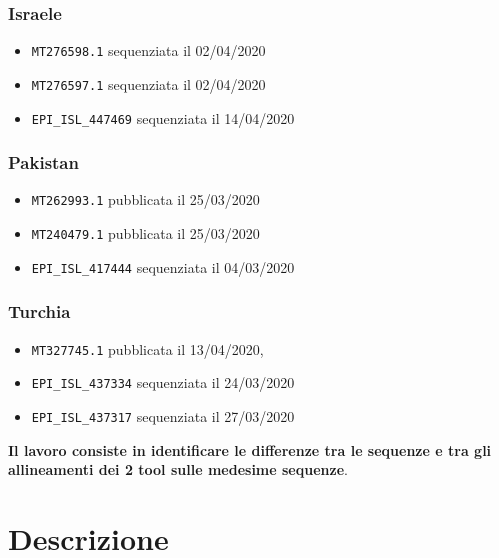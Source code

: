 \documentclass[11pt,italian]{article}
\begin{document}
\subsubsection*{Israele}
\begin{itemize}
	\item \lstinline{MT276598.1} sequenziata il 02/04/2020
	\item \lstinline{MT276597.1} sequenziata il 02/04/2020
	\item \lstinline{EPI_ISL_447469} sequenziata il 14/04/2020
\end{itemize}

\subsubsection*{Pakistan}
\begin{itemize}
	\item \lstinline{MT262993.1} pubblicata il 25/03/2020
	\item \lstinline{MT240479.1} pubblicata il 25/03/2020
	\item \lstinline{EPI_ISL_417444} sequenziata il 04/03/2020
\end{itemize}

\subsubsection*{Turchia}
\begin{itemize}
	\item \lstinline{MT327745.1} pubblicata il 13/04/2020,
	\item \lstinline{EPI_ISL_437334} sequenziata il 24/03/2020
	\item \lstinline{EPI_ISL_437317} sequenziata il 27/03/2020
\end{itemize}
\textbf{Il lavoro consiste in identificare le differenze tra le sequenze e tra gli allineamenti dei 2 tool sulle medesime sequenze}. \newpage

\section{Descrizione}
\end{document}
